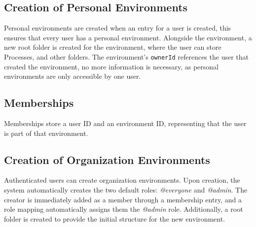 \subsection{Creation of Personal Environments}

%
%

Personal environments are created when an entry for a user is created, this ensures that
every user has a personal environment.
Alongside the environment, a new root folder is created for the environment, where the
user can store Processes, and other folders.
The environment's \lstinline{ownerId} references the user that created the environment,
no more information is necessary, as personal environments are only accessible by one
user.

\subsection{Memberships}

Memberships store a user ID and an environment ID, representing that the user is part of that environment.

\subsection{Creation of Organization Environments}

Authenticated users can create organization environments.
Upon creation, the system automatically creates the two default roles: \textit{@everyone}
and \textit{@admin}.
The creator is immediately added as a member through a membership entry,
and a role mapping automatically assigns them the \textit{@admin} role.
Additionally, a root folder is created to provide the initial structure for the new environment.


